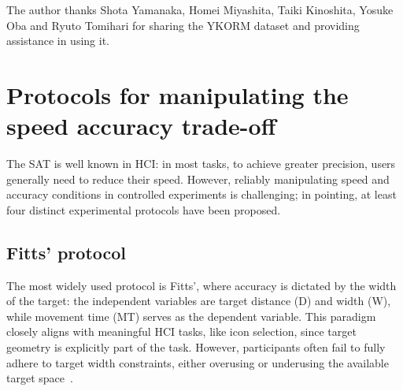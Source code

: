 \documentclass[acmlarge, manuscript,review]{acmart}
\newcommand{\ide}{\ensuremath{{\text{ID}_e}}\xspace}
\begin{document}




\begin{acks}
  The author thanks Shota Yamanaka, Homei Miyashita, Taiki Kinoshita, Yosuke Oba and Ryuto Tomihari for sharing the YKORM dataset and providing assistance in using it.
\end{acks}




\appendix
\makeatletter
\show\subsectionautorefname
\makeatother
\renewcommand{\subsectionautorefname}{Appendix}

\section{Protocols for manipulating the speed accuracy trade-off \label{app:protocols}}
The SAT is well known in HCI: in most tasks, to achieve greater precision, users generally need to reduce their speed. However, reliably manipulating speed and accuracy conditions in controlled experiments is challenging; in pointing, at least four distinct experimental protocols have been proposed.

\subsection{Fitts' protocol\label{app:protocols::fitts_protocol}}
The most widely used protocol is Fitts', where accuracy is dictated by the width of the target: the independent variables are target distance (D) and width (W), while movement time (MT) serves as the dependent variable. This paradigm closely aligns with meaningful HCI tasks, like icon selection, since target geometry is explicitly part of the task. However, participants often fail to fully adhere to target width constraints, either overusing or underusing the available target space~\cite{guiard2011,zhai2004nominal}.
\end{document}
